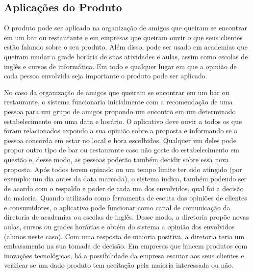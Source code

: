 \subsection{Aplicações do Produto}

    O produto pode ser aplicado na organização de amigos que queiram se encontrar em um bar ou restaurante e em empresas que queiram ouvir o que seus clientes estão falando sobre o seu produto. Além disso, pode ser usado em academias que queiram mudar a grade horária de suas atividades e aulas, assim como escolas de inglês e cursos de informática. Em todo e qualquer lugar em que a opinião de cada pessoa envolvida seja importante o produto pode ser aplicado. 

    No caso da organização de amigos que queiram se encontrar em um bar ou restaurante, o sistema funcionaria inicialmente com a recomendação de uma pessoa para um grupo de amigos propondo um encontro em um determinado estabelecimento em uma data e horário. O aplicativo deve ouvir a todos os que foram relacionados expondo a sua opinião sobre a proposta e informando se a pessoa concorda em estar no local e hora escolhidos. Qualquer um deles pode propor outro tipo de bar ou restaurante caso não goste do estabelecimento em questão e, desse modo, as pessoas poderão também decidir sobre essa nova proposta. Após todos terem opinado ou um tempo limite ter sido atingido (por exemplo: um dia antes da data marcada), o sistema indica, também podendo ser de acordo com o respaldo e poder de cada um dos envolvidos, qual foi a decisão da maioria. Quando utilizado como ferramenta de escuta das opiniões de clientes e consumidores, o aplicativo pode funcionar como canal de comunicação da diretoria de academias ou escolas de inglês. Desse modo, a diretoria propõe novas aulas, cursos ou grades horárias e obtém do sistema a opinião dos envolvidos (alunos neste caso). Com uma resposta de maioria positiva, a diretoria teria um embasamento na sua tomada de decisão. Em empresas que lancem produtos com inovações tecnológicas, há a possibilidade da empresa escutar aos seus clientes e verificar se um dado produto tem aceitação pela maioria interessada ou não.
